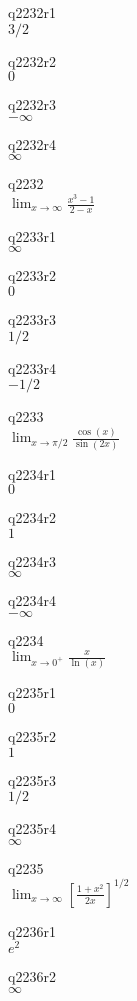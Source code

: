 q2232r1\\
\(\displaystyle 3/2 \)

q2232r2\\
\(\displaystyle 0 \)

q2232r3\\
\(\displaystyle -\infty \)

q2232r4\\
\(\displaystyle \infty \)

q2232\\
\(\displaystyle \lim_{x \rightarrow \infty} \frac{x^3 - 1}{2-x} \)

q2233r1\\
\(\displaystyle \infty \)

q2233r2\\
\(\displaystyle 0 \)

q2233r3\\
\(\displaystyle 1/2 \)

q2233r4\\
\(\displaystyle -1/2 \)

q2233\\
\(\displaystyle \lim_{x \rightarrow \pi/2} \frac{\cos(x)}{\sin(2x)} \)

q2234r1\\
\(\displaystyle 0 \)

q2234r2\\
\(\displaystyle 1 \)

q2234r3\\
\(\displaystyle \infty \)

q2234r4\\
\(\displaystyle -\infty \)

q2234\\
\(\displaystyle \lim_{x \rightarrow 0^+} \frac{x}{\ln(x)} \)

q2235r1\\
\(\displaystyle 0 \)

q2235r2\\
\(\displaystyle 1 \)

q2235r3\\
\(\displaystyle 1/2 \)

q2235r4\\
\(\displaystyle \infty \)

q2235\\
\(\displaystyle \lim_{x \rightarrow \infty} \left [ \frac{1+x^2}{2x} \right ] ^{1/2} \)

q2236r1\\
\(\displaystyle e^2 \)

q2236r2\\
\(\displaystyle \infty \)

